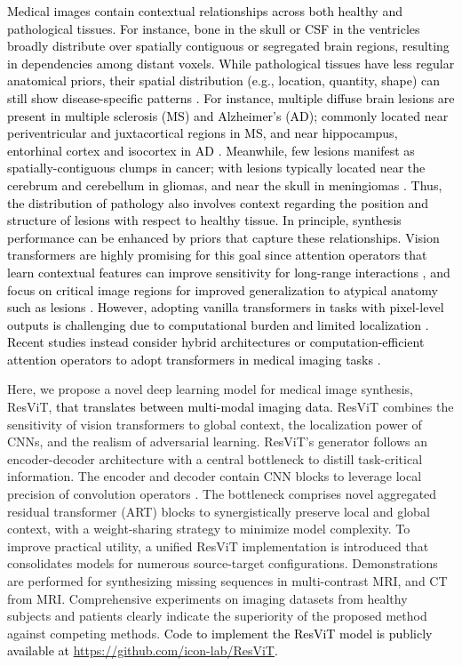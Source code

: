 \documentclass[journal,twoside,web]{ieeecolor}
\newcommand*{\revhl}{\textcolor{black}}
\begin{document}
\revhl{Medical images contain contextual relationships across both healthy and pathological tissues. For instance, bone in the skull or CSF in the ventricles broadly distribute over spatially contiguous or segregated brain regions, resulting in dependencies among distant voxels. While pathological tissues have less regular anatomical priors, their spatial distribution (e.g., location, quantity, shape) can still show disease-specific patterns \cite{adam2014grainger}. For instance, multiple diffuse brain lesions are present in multiple sclerosis (MS) and Alzheimer’s (AD); commonly located near periventricular and juxtacortical regions in MS, and near hippocampus, entorhinal cortex and isocortex in AD \cite{ellison2012neuropathology}. Meanwhile, few lesions manifest as spatially-contiguous clumps in cancer; with lesions typically located near the cerebrum and cerebellum in gliomas, and near the skull in meningiomas \cite{ellison2012neuropathology}. Thus, the distribution of pathology also involves context regarding the position and structure of lesions with respect to healthy tissue. In principle, synthesis performance can be enhanced by priors that capture these relationships. 
Vision transformers are highly promising for this goal since attention operators that learn contextual features can improve sensitivity for long-range interactions \cite{vit}, and focus on critical image regions for improved generalization to atypical anatomy such as lesions \cite{attention_unet}. 
However, adopting vanilla transformers in tasks with pixel-level outputs is challenging due to computational burden and limited localization \cite{trans_unet}. Recent studies instead consider hybrid architectures or computation-efficient attention operators to adopt transformers in medical imaging tasks \cite{TransGAN,TransCT,SLATER,kamran2021,ganbert,ptnet}.}  

\par
Here, we propose a novel deep learning model for medical image synthesis, ResViT, \revhl{that translates between multi-modal imaging data.} ResViT combines the sensitivity of vision transformers to global context, the localization power of CNNs, and the realism of adversarial learning. ResViT's generator follows an encoder-decoder architecture with a central bottleneck to distill task-critical information. The encoder and decoder contain CNN blocks to leverage local precision of convolution operators \cite{resnet}. The bottleneck comprises novel aggregated residual transformer (ART) blocks to synergistically preserve local and global context, with a weight-sharing strategy to minimize model complexity. To improve practical utility, a unified ResViT implementation is introduced that consolidates models for numerous source-target configurations. Demonstrations are performed for synthesizing missing sequences in multi-contrast MRI, and CT from MRI. Comprehensive experiments on imaging datasets from healthy subjects and patients clearly indicate the superiority of the proposed method against competing methods. \revhl{Code to implement the ResViT model is publicly available at \href{https://github.com/icon-lab/ResViT}{https://github.com/icon-lab/ResViT}.} 
\end{document}
